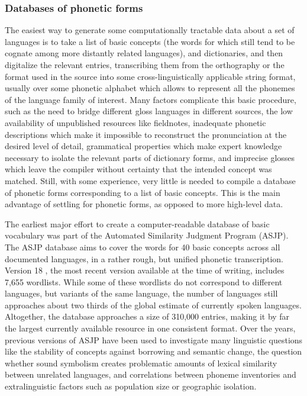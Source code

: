 \subsubsection{Databases of phonetic forms}
The easiest way to generate some computationally tractable data about a set of languages is to take a list of basic concepts (the words for which still tend to be cognate among more distantly related languages), and dictionaries, and then digitalize the relevant entries, transcribing them from the orthography or the format used in the source into some cross-linguistically applicable string format, usually over some phonetic alphabet which allows to represent all the phonemes of the language family of interest. Many factors complicate this basic procedure, such as the need to bridge different gloss languages in different sources, the low availability of unpublished resources like fieldnotes, inadequate phonetic descriptions which make it impossible to reconstruct the pronunciation at the desired level of detail, grammatical properties which make expert knowledge necessary to isolate the relevant parts of dictionary forms, and imprecise glosses which leave the compiler without certainty that the intended 
concept was matched. Still, with some experience, very little is needed to compile a database of phonetic forms corresponding to a list of basic concepts. This is the main advantage of settling for phonetic forms, as opposed to more high-level data.

The earliest major effort to create a computer-readable database of basic vocabulary was part of the Automated Similarity Judgment Program (ASJP). The ASJP database aims to cover the words for 40 basic concepts across all documented languages, in a rather rough, but unified phonetic transcription. Version 18 \citep{asjp18}, the most recent version available at the time of writing, includes 7,655 wordlists. While some of these wordlists do not correspond to different languages, but variants of the same language, the number of languages still approaches about two thirds of the global estimate of currently spoken languages. Altogether, the database approaches a size of 310,000 entries, making it by far the largest currently available resource in one consistent format. Over the years, previous versions of ASJP have been used to investigate many linguistic questions like the stability of concepts against borrowing and semantic change, the question whether sound symbolism creates problematic 
amounts of lexical similarity between unrelated languages, and correlations between phoneme inventories and extralinguistic factors such as population size or geographic isolation.

